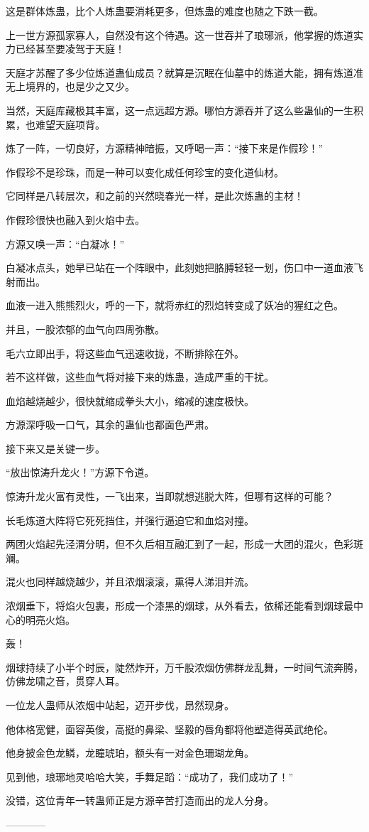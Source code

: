 \begin{this_body}
这是群体炼蛊，比个人炼蛊要消耗更多，但炼蛊的难度也随之下跌一截。

上一世方源孤家寡人，自然没有这个待遇。这一世吞并了琅琊派，他掌握的炼道实力已经甚至要凌驾于天庭！

天庭才苏醒了多少位炼道蛊仙成员？就算是沉眠在仙墓中的炼道大能，拥有炼道准无上境界的，也是少之又少。

当然，天庭库藏极其丰富，这一点远超方源。哪怕方源吞并了这么些蛊仙的一生积累，也难望天庭项背。

炼了一阵，一切良好，方源精神暗振，又呼喝一声：“接下来是作假珍！”

作假珍不是珍珠，而是一种可以变化成任何珍宝的变化道仙材。

它同样是八转层次，和之前的兴然晓春光一样，是此次炼蛊的主材！

作假珍很快也融入到火焰中去。

方源又唤一声：“白凝冰！”

白凝冰点头，她早已站在一个阵眼中，此刻她把胳膊轻轻一划，伤口中一道血液飞射而出。

血液一进入熊熊烈火，呼的一下，就将赤红的烈焰转变成了妖冶的猩红之色。

并且，一股浓郁的血气向四周弥散。

毛六立即出手，将这些血气迅速收拢，不断排除在外。

若不这样做，这些血气将对接下来的炼蛊，造成严重的干扰。

血焰越烧越少，很快就缩成拳头大小，缩减的速度极快。

方源深呼吸一口气，其余的蛊仙也都面色严肃。

接下来又是关键一步。

“放出惊涛升龙火！”方源下令道。

惊涛升龙火富有灵性，一飞出来，当即就想逃脱大阵，但哪有这样的可能？

长毛炼道大阵将它死死挡住，并强行逼迫它和血焰对撞。

两团火焰起先泾渭分明，但不久后相互融汇到了一起，形成一大团的混火，色彩斑斓。

混火也同样越烧越少，并且浓烟滚滚，熏得人涕泪并流。

浓烟垂下，将焰火包裹，形成一个漆黑的烟球，从外看去，依稀还能看到烟球最中心的明亮火焰。

轰！

烟球持续了小半个时辰，陡然炸开，万千股浓烟仿佛群龙乱舞，一时间气流奔腾，仿佛龙啸之音，贯穿人耳。

一位龙人蛊师从浓烟中站起，迈开步伐，昂然现身。

他体格宽健，面容英俊，高挺的鼻梁、坚毅的唇角都将他塑造得英武绝伦。

他身披金色龙鳞，龙瞳琥珀，额头有一对金色珊瑚龙角。

见到他，琅琊地灵哈哈大笑，手舞足蹈：“成功了，我们成功了！”

没错，这位青年一转蛊师正是方源辛苦打造而出的龙人分身。

------------

\end{this_body}

